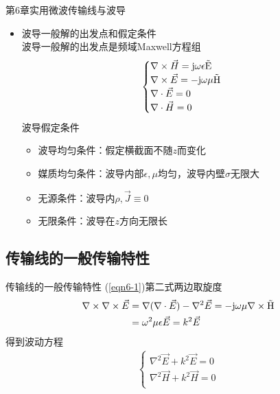 \begin{frame}{第6章\quad 实用微波传输线与波导}
    \begin{itemize}
        \item 波导一般解的出发点和假定条件\\
        波导一般解的出发点是频域Maxwell方程组
        \begin{align}
            \begin{cases}
                \nabla\times\vec{H}=\rm{j}\omega\epsilon\vec{E}\\
                \nabla\times\vec{E}=-\rm{j}\omega\mu\vec{H}\\
                \nabla\cdot\vec{E}=0\\
                \nabla\cdot\vec{H}=0
            \end{cases}\label{eqn6-1}
        \end{align}
        波导假定条件
        \begin{itemize}
            \item 波导均匀条件：假定横截面不随$z$而变化
            \item 媒质均匀条件：波导内部$\epsilon,\mu$均匀，波导内壁$\sigma$无限大
            \item 无源条件：波导内$\rho,\vec{J}\equiv 0$
            \item 无限条件：波导在$z$方向无限长
        \end{itemize}
    \end{itemize}
\end{frame}

\subsection{传输线的一般传输特性}
\begin{frame}{传输线的一般传输特性}
(\ref{eqn6-1})第二式两边取旋度
\begin{align*}
    \nabla\times\nabla\times\vec{E}&=\nabla(\nabla\cdot\vec{E})-\nabla^2\vec{E}=-\rm{j}\omega\mu\nabla\times\vec{H}\\
&=\omega^2\mu\epsilon\vec{E}=k^2\vec{E}
\end{align*}
得到波动方程
\begin{align}
    \begin{cases}
        \nabla^2\vec{E}+k^2\vec{E}=0 \\
        \nabla^2\vec{H}+k^2\vec{H}=0 \\
    \end{cases}\label{eqn6-2}
\end{align}
\end{frame}

